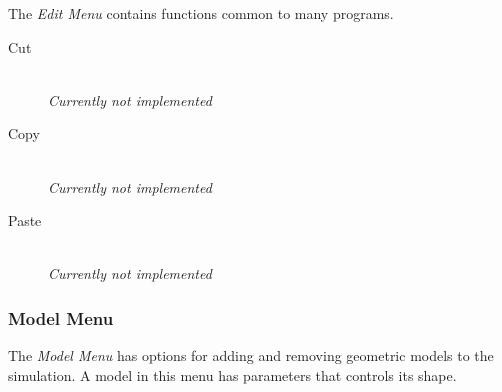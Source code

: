 \documentclass[11pt]{article}
\begin{document}
The \emph{Edit Menu} contains functions common to many programs.

\begin{description}

  \item[Cut] \hfill \\
  \emph{Currently not implemented}
  
  \item[Copy] \hfill \\
  \emph{Currently not implemented}
  
  \item[Paste] \hfill \\
  \emph{Currently not implemented}

\end{description}

\subsubsection{Model Menu}

The \emph{Model Menu} has options for adding and removing geometric models to the simulation. A model in this menu has parameters that controls its shape.
\end{document}
